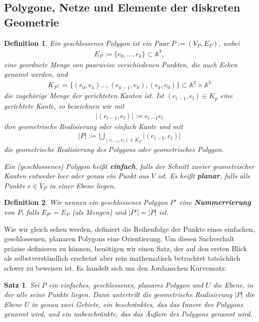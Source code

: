 \documentclass[]{article}
\newtheorem{Definition}{Definition}
\newtheorem{Satz}{Satz}
\begin{document}
\subsection{Polygone, Netze und Elemente der diskreten Geometrie}
\begin{Definition}
Ein geschlossenes Polygon ist ein Paar $P:=(V_P,E_P)$, wobei   
\begin{align*}
E_P := \{e_0, \hdots, e_k \} \subset \mathbb{A}^3,
\end{align*}
eine geordnete Menge von paarweise verschiedenen Punkten, die auch Ecken genannt werden, und   
\begin{align*}
K_P: = \biggl \{(e_0,e_1)  \hdots, (e_{k-1},e_k), (e_k,e_0) \biggr\} \subset \mathbb{A}^3 \times \mathbb{A}^3
\end{align*}
die zugehörige Menge der gerichteten Kanten ist. 
Ist $(e_{l-1},e_l) \in K_p$ eine gerichtete Kante, so bezeichnen wir mit 
\begin{align*}
|(e_{l-1},e_l)| := \overline{e_{l-1}e_l} 
\end{align*}
ihre geometrische Realisierung oder einfach Kante und mit 
\begin{align*}
|P|:= \bigcup_{(e_{l-1},e_l) \in K_P} |(e_{l-1},e_l)|
\end{align*}
 die geometrische Realisierung des Polygons oder geometrisches Polygon.


Ein (geschlossenes) Polygon heißt \textbf{einfach}, falls der Schnitt zweier geometrischer Kanten  entweder leer oder genau ein Punkt aus $V$ ist.
Es heißt \textbf{planar}, falls alle Punkte $e \in V_P$ in einer Ebene liegen.
\end{Definition}


 

\begin{Definition}
Wir nennen  ein geschlossenes Polygon $P'$ eine \textbf{Nummerrierung} von $P$, falls 
$E_{P'} =E_{P}$ (als Mengen) und
$|P'| = |P|$ ist. 
\end{Definition}


Wie wir gleich sehen werden, definiert die Reihenfolge der Punkte eines einfachen, geschlossenen, planaren Polygons eine Orientierung. Um diesen Sachverhalt präzise definieren zu können, benötigen wir einen Satz, der 
auf den ersten Blick als selbstverständlich erscheint aber rein mathematisch betrachtet tatsächlich schwer zu beweisen ist. Es handelt sich um den Jordanschen Kurvensatz:

\begin{Satz}
Sei $P$ ein einfaches, geschlossenes, planares Polygon und $U$ die Ebene, in der alle seine Punkte liegen. 
Dann unterteilt die geometrische Realisierung $|P|$ die Ebene $U$ in genau zwei Gebiete, ein beschränktes, das das Innere des Polygons genannt wird, und ein unbeschränkte, das das Äußere des Polygons genannt wird.
\end{Satz}
\end{document}
